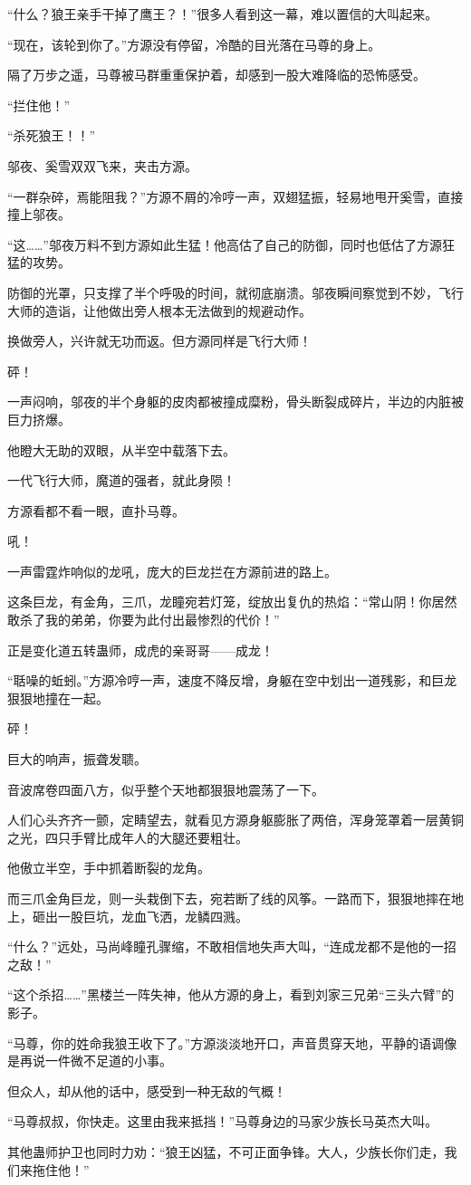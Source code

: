 \begin{this_body}
“什么？狼王亲手干掉了鹰王？！”很多人看到这一幕，难以置信的大叫起来。

“现在，该轮到你了。”方源没有停留，冷酷的目光落在马尊的身上。

隔了万步之遥，马尊被马群重重保护着，却感到一股大难降临的恐怖感受。

“拦住他！”

“杀死狼王！！”

邬夜、奚雪双双飞来，夹击方源。

“一群杂碎，焉能阻我？”方源不屑的冷哼一声，双翅猛振，轻易地甩开奚雪，直接撞上邬夜。

“这……”邬夜万料不到方源如此生猛！他高估了自己的防御，同时也低估了方源狂猛的攻势。

防御的光罩，只支撑了半个呼吸的时间，就彻底崩溃。邬夜瞬间察觉到不妙，飞行大师的造诣，让他做出旁人根本无法做到的规避动作。

换做旁人，兴许就无功而返。但方源同样是飞行大师！

砰！

一声闷响，邬夜的半个身躯的皮肉都被撞成糜粉，骨头断裂成碎片，半边的内脏被巨力挤爆。

他瞪大无助的双眼，从半空中载落下去。

一代飞行大师，魔道的强者，就此身陨！

方源看都不看一眼，直扑马尊。

吼！

一声雷霆炸响似的龙吼，庞大的巨龙拦在方源前进的路上。

这条巨龙，有金角，三爪，龙瞳宛若灯笼，绽放出复仇的热焰：“常山阴！你居然敢杀了我的弟弟，你要为此付出最惨烈的代价！”

正是变化道五转蛊师，成虎的亲哥哥——成龙！

“聒噪的蚯蚓。”方源冷哼一声，速度不降反增，身躯在空中划出一道残影，和巨龙狠狠地撞在一起。

砰！

巨大的响声，振聋发聩。

音波席卷四面八方，似乎整个天地都狠狠地震荡了一下。

人们心头齐齐一颤，定睛望去，就看见方源身躯膨胀了两倍，浑身笼罩着一层黄铜之光，四只手臂比成年人的大腿还要粗壮。

他傲立半空，手中抓着断裂的龙角。

而三爪金角巨龙，则一头栽倒下去，宛若断了线的风筝。一路而下，狠狠地摔在地上，砸出一股巨坑，龙血飞洒，龙鳞四溅。

“什么？”远处，马尚峰瞳孔骤缩，不敢相信地失声大叫，“连成龙都不是他的一招之敌！”

“这个杀招……”黑楼兰一阵失神，他从方源的身上，看到刘家三兄弟“三头六臂”的影子。

“马尊，你的姓命我狼王收下了。”方源淡淡地开口，声音贯穿天地，平静的语调像是再说一件微不足道的小事。

但众人，却从他的话中，感受到一种无敌的气概！

“马尊叔叔，你快走。这里由我来抵挡！”马尊身边的马家少族长马英杰大叫。

其他蛊师护卫也同时力劝：“狼王凶猛，不可正面争锋。大人，少族长你们走，我们来拖住他！”

\end{this_body}

